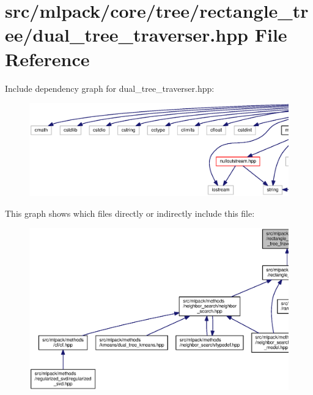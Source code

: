 \section{src/mlpack/core/tree/rectangle\+\_\+tree/dual\+\_\+tree\+\_\+traverser.hpp File Reference}
\label{rectangle__tree_2dual__tree__traverser_8hpp}
Include dependency graph for dual\+\_\+tree\+\_\+traverser.\+hpp\+:
\nopagebreak
\begin{figure}[H]
\begin{center}
\leavevmode
\includegraphics[width=350pt]{rectangle__tree_2dual__tree__traverser_8hpp__incl}
\end{center}
\end{figure}
This graph shows which files directly or indirectly include this file\+:
\nopagebreak
\begin{figure}[H]
\begin{center}
\leavevmode
\includegraphics[width=350pt]{rectangle__tree_2dual__tree__traverser_8hpp__dep__incl}
\end{center}
\end{figure}
